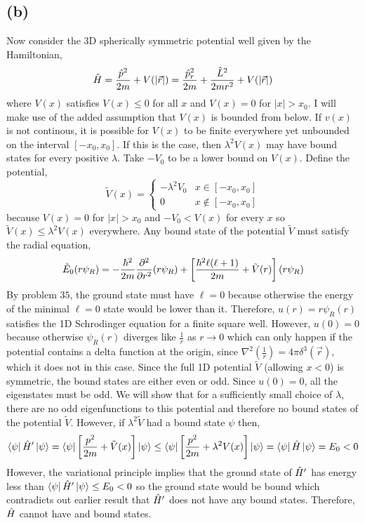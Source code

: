 \documentclass[12pt]{extarticle}
\begin{document}
\subsection*{(b)}
Now consider the 3D spherically symmetric potential well given by the Hamiltonian,
\[\hat{H} = \frac{\hat{p}^2}{2m} + V(|\vec{r}|) = \frac{\hat{p}_r^2}{2m} + \frac{\hat{L}^2}{2mr^2} + V(|\vec{r}|)\]
where $V(x)$ satisfies $V(x) \le 0$ for all $x$ and $V(x) = 0$ for $|x| > x_0$. I will make use of the added assumption that $V(x)$ is bounded from below. If $v(x)$ is not continous, it is possible for $V(x)$ to be finite everywhere yet unbounded on the interval $[-x_0, x_0]$. If this is the case, then $\lambda^2 V(x)$ may have bound states for every positive $\lambda$. Take $-V_0$ to be a lower bound on $V(x)$. Define the potential, 
\[\tilde{V}(x) = \begin{cases}
-\lambda ^2 V_0 & x \in [-x_0, x_0] \\
0 & x \notin [-x_0, x_0]
\end{cases}\] 
because $V(x) = 0$ for $|x| > x_0$ and $-V_0 < V(x)$ for every $x$ so $\tilde{V}(x) \le \lambda^2 V(x)$ everywhere. Any bound state of the potential $\tilde{V}$ must satisfy the radial equation,
\[ \tilde{E}_0 (r \psi_R) = - \frac{\hbar^2}{2m} \frac{\partial^2{}}{\partial{r}^2} (r \psi_R) + \left[ \frac{\hbar^2 \ell (\ell + 1)}{2 m} + \tilde{V}(r) \right] (r \psi_R) \] 
By problem $35$, the ground state must have $\ell = 0$ because otherwise the energy of the minimal $\ell = 0$ state would be lower than it. Therefore, $u(r) = r \psi_R(r)$ satisfies the 1D Schrodinger equation for a finite square well. However, $u(0) = 0$ because otherwise $\psi_R(r)$ diverges like $\frac{1}{r}$ as $r \to 0$ which can only happen if the potential contains a delta function at the origin, since $\nabla^2 \left(\frac{1}{r}\right) = 4 \pi \delta^3(\vec{r})$, which it does not in this case. Since the full 1D potential $\tilde{V}$ (allowing $x < 0$) is symmetric, the bound states are either even or odd. Since $u(0) = 0$, all the eigenstates must be odd. We will show that for a sufficiently small choice of $\lambda$, there are no odd eigenfunctions to this potential and therefore no bound states of the potential $\tilde{V}$. However, if $\lambda^2 \tilde{V}$ had a bound state $\psi$ then,
\[ \left< \psi \right| \hat{H}' \left| \psi \right> = \left< \psi \right| \left[ \frac{p^2}{2m} + \tilde{V}(x) \right] \left| \psi \right> \le \left< \psi \right| \left[ \frac{p^2}{2m} + \lambda^2 V(x) \right] \left| \psi \right> = \left< \psi \right| \hat{H} \left| \psi \right> = E_0 < 0 \]
However, the variational principle implies that the ground state of $\hat{H}'$ has energy less than $\left< \psi \right| \hat{H}' \left| \psi \right> \le E_0 < 0$ so the ground state would be bound which contradicts out earlier result that $\hat{H}'$ does not have any bound states. Therefore, $\hat{H}$ cannot have and bound states. \bigskip \\\\
\end{document}
